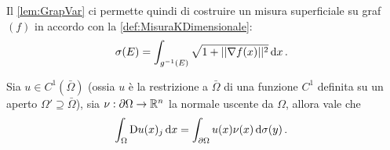 Il \cref{lem:GrapVar} ci permette quindi di costruire un misura superficiale su graf$(f)$ in accordo con la \cref{def:MisuraKDimensionale}:
\begin{equation}\label{eq:MisuraSuperficialeGrafico}
	\sigma(E)=\int_{g^{-1}(E)} \sqrt{1+||\nabla f(x)||^2} \,\mathrm d x\, \text{. }
\end{equation}


\begin{proposition}\label{prop:FormulaStokes}
	Sia $u\in C^1(\bar \Omega)$ (ossia $u$ è la restrizione a $\bar \Omega$ di una funzione $C^1$ definita su un aperto
	$\Omega'\supseteq \bar \Omega$), sia $\nu:\partial \Omega \rightarrow \mathbb R^n$ la normale uscente da $\Omega$, allora vale che
	\begin{equation}\label{eq:FormulaStokes}
		\int_{\Omega} \mathrm D u(x)_j \,\mathrm d x = \int_{\partial \Omega} u(x)\nu(x) \,\mathrm d \sigma(y)\, \text{. }
	\end{equation}
\end{proposition}


